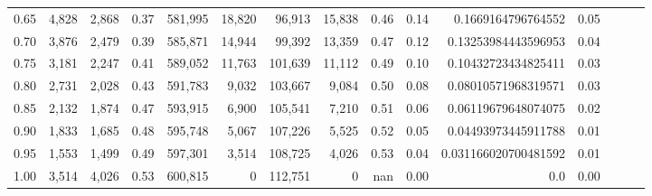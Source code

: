 \begin{tabular}{rrrrrrrrrrrrrrr}
0.65 &   4,828 &   2,868 &  0.37 &  581,995 &   18,820 &   96,913 &   15,838 &  0.46 &  0.14 &    0.1669164796764552 &      0.05 \\
0.70 &   3,876 &   2,479 &  0.39 &  585,871 &   14,944 &   99,392 &   13,359 &  0.47 &  0.12 &   0.13253984443596953 &      0.04 \\
0.75 &   3,181 &   2,247 &  0.41 &  589,052 &   11,763 &  101,639 &   11,112 &  0.49 &  0.10 &   0.10432723434825411 &      0.03 \\
0.80 &   2,731 &   2,028 &  0.43 &  591,783 &    9,032 &  103,667 &    9,084 &  0.50 &  0.08 &   0.08010571968319571 &      0.03 \\
0.85 &   2,132 &   1,874 &  0.47 &  593,915 &    6,900 &  105,541 &    7,210 &  0.51 &  0.06 &   0.06119679648074075 &      0.02 \\
0.90 &   1,833 &   1,685 &  0.48 &  595,748 &    5,067 &  107,226 &    5,525 &  0.52 &  0.05 &   0.04493973445911788 &      0.01 \\
0.95 &   1,553 &   1,499 &  0.49 &  597,301 &    3,514 &  108,725 &    4,026 &  0.53 &  0.04 &  0.031166020700481592 &      0.01 \\
1.00 &   3,514 &   4,026 &  0.53 &  600,815 &        0 &  112,751 &        0 &   nan &  0.00 &                   0.0 &      0.00 \\
\bottomrule
\end{tabular}
